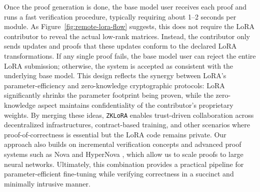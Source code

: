 \documentclass[11pt]{article}
\begin{document}
Once the proof generation is done, the base model user receives each proof and runs a fast verification procedure, typically requiring about 1--2 seconds per module. As Figure~\ref{fig:remote-lora-flow} suggests, this does not require the LoRA contributor to reveal the actual low-rank matrices. Instead, the contributor only sends updates and proofs that these updates conform to the declared LoRA transformations. If any single proof fails, the base model user can reject the entire LoRA submission; otherwise, the system is accepted as consistent with the underlying base model. This design reflects the synergy between LoRA’s parameter-efficiency and zero-knowledge cryptographic protocols: LoRA significantly shrinks the parameter footprint being proven, while the zero-knowledge aspect maintains confidentiality of the contributor’s proprietary weights. By merging these ideas, \texttt{ZKLoRA} enables trust-driven collaboration across decentralized infrastructures, contract-based training, and other scenarios where proof-of-correctness is essential but the LoRA code remains private. Our approach also builds on incremental verification concepts \cite{valiant2008incrementally} and advanced proof systems such as Nova \cite{kothapalli2022nova} and HyperNova \cite{kothapalli2024hypernova}, which allow us to scale proofs to large neural networks. Ultimately, this combination provides a practical pipeline for parameter-efficient fine-tuning while verifying correctness in a succinct and minimally intrusive manner.
\end{document}
